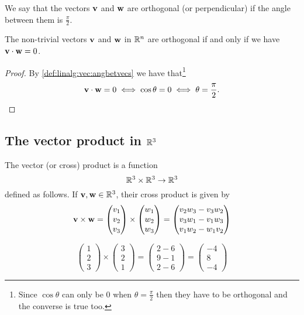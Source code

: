 \documentclass[10pt, a4paper]{article}
\begin{document}
We say that the vectors $\mathbf{v}$ and $\mathbf{w}$ are orthogonal (or perpendicular) if the angle between them is $\frac{\pi}{2}$. \\

\begin{corollary}
    The non-trivial vectors $\mathbf{v}$ and $\mathbf{w}$ in $\mathbb{R} ^ n$ are orthogonal if and only if we have $\mathbf{v \cdot w} = 0$.

    \begin{proof}
        By \autoref{def:linalg:vec:angbetvecs} we have that\footnote{Since $\cos\theta$ can only be $0$ when $\theta = \frac{\pi}{2}$ then they have to be orthogonal and the converse is true too.}
        \[
        \mathbf{v \cdot w} = 0 \iff \cos\theta = 0 \iff \theta = \frac{\pi}{2}.
        \]
    \end{proof}
\end{corollary}

\subsection{The vector product in \texorpdfstring{$\mathbb{R} ^ 3$}{}}
\begin{definition}
    The vector (or cross) product is a function
    \[
    \mathbb{R} ^ 3 \times \mathbb{R} ^ 3 \rightarrow \mathbb{R} ^ 3
    \]
    defined as follows. If $\mathbf{v, w} \in \mathbb{R} ^ 3$, their cross product is given by
    \[
    \mathbf{v \times w} =
    \begin{pmatrix} v_1 \\ v_2 \\ v_3 \end{pmatrix}
    \times
    \begin{pmatrix} w_1 \\ w_2 \\ w_3 \end{pmatrix}
    =
    \begin{pmatrix} v_2 w_3 - v_3 w_2 \\ v_3 w_1 - v_1 w_3 \\ v_1 w_2 - w_1 v_2 \end{pmatrix}
    \]
\end{definition}

\begin{example}
    \[
    \begin{pmatrix}
        1 \\ 2 \\ 3
    \end{pmatrix}
    \times
    \begin{pmatrix}
        3 \\ 2 \\ 1
    \end{pmatrix}
    = \begin{pmatrix}
        2 - 6 \\
        9 - 1 \\
        2 - 6
    \end{pmatrix}
    =
    \begin{pmatrix}
        -4 \\ 8 \\ -4
    \end{pmatrix}
    \]
\end{example}
\end{document}
